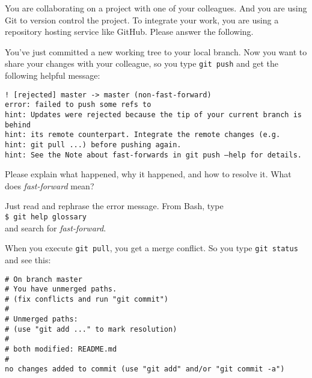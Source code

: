\documentclass[10pt]{examdesign}
\begin{document}
\begin{shortanswer}[title={Longer Answer (5 pts each)},
                    rearrange=no,resetcounter=no]


\begin{block}[questions=2]
You are collaborating on a project with one of your colleagues. And you
are using Git to version control the project. To integrate your work,
you are using a repository hosting service like GitHub.  Please
answer the following.

\begin{question}
  You've just committed a new working tree to your local branch.  Now
  you want to share your changes with your colleague, so you type
  \texttt{git push} and get the following helpful message:

  \texttt{! [rejected]        master -> master (non-fast-forward) \\
    error: failed to push some refs to \textquotesingle \\
    hint: Updates were rejected because the tip of your current branch is behind \\
    hint: its remote counterpart. Integrate the remote changes (e.g. \\
    hint: \textquotesingle git pull ...\textquotesingle) before pushing again. \\
    hint: See the \textquotesingle Note about fast-forwards\textquotesingle\ in \textquotesingle git push --help\textquotesingle\ for details.
  }

  Please explain what happened, why it happened, and how to resolve it.
  What does \emph{fast-forward} mean?
  \vspace{80mm}
  \begin{answer}
    Just read and rephrase the error message. From Bash, type \\
    \texttt{\$ git help glossary} \\
    and search for \emph{fast-forward}.
  \end{answer}
\end{question}

\begin{question}
  When you execute \texttt{git pull}, you get a merge conflict.
  So you type \texttt{git status} and see this:

  \texttt{\# On branch master \\
    \# You have unmerged paths. \\
    \#   (fix conflicts and run "git commit") \\
    \# \\
    \# Unmerged paths: \\
    \#   (use "git add ..." to mark resolution) \\
    \# \\
    \# both modified:      README.md \\
    \# \\
    no changes added to commit (use "git add" and/or "git commit -a")
  }


\end{question}
\end{block}
\end{shortanswer}
\end{document}
